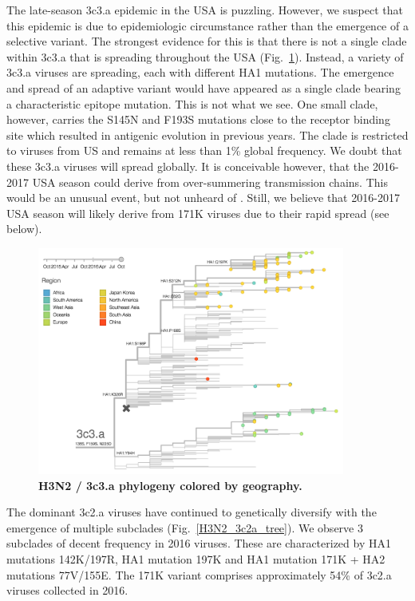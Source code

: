 \documentclass[11pt,oneside,letterpaper]{article}
\begin{document}
The late-season 3c3.a epidemic in the USA is puzzling. However, we suspect that this epidemic is due to epidemiologic circumstance rather than the emergence of a selective variant. The strongest evidence for this is that there is not a single clade within 3c3.a that is spreading throughout the USA (Fig.\ \ref{H3N2_3c3a_tree}). Instead, a variety of 3c3.a viruses are spreading, each with different HA1 mutations. The emergence and spread of an adaptive variant would have appeared as a single clade bearing a characteristic epitope mutation. This is not what we see. One small clade, however, carries the S145N and F193S mutations close to the receptor binding site which resulted in antigenic evolution in previous years. The clade is restricted to viruses from US and remains at less than 1\% global frequency. We doubt that these 3c3.a viruses will spread globally. It is conceivable however, that the 2016-2017 USA season could derive from over-summering transmission chains. This would be an unusual event, but not unheard of \cite{bedford2010global}. Still, we believe that 2016-2017 USA season will likely derive from 171K viruses due to their rapid spread (see below).

\begin{figure}[H]
	\centering
	\includegraphics[width=0.9\textwidth]{../figures/sep-2016/H3N2_3c3a_tree.png}
	\caption{\textbf{H3N2 / 3c3.a phylogeny colored by geography.}
	}
	\label{H3N2_3c3a_tree}
\end{figure}

\pagebreak

The dominant 3c2.a viruses have continued to genetically diversify with the emergence of multiple subclades (Fig.\ \ref{H3N2_3c2a_tree}). We observe 3 subclades of decent frequency in 2016 viruses. These are characterized by HA1 mutations 142K/197R, HA1 mutation 197K and HA1 mutation 171K + HA2 mutations 77V/155E. The 171K variant comprises approximately 54\% of 3c2.a viruses collected in 2016.
\end{document}
